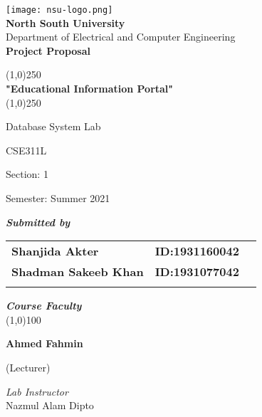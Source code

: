 \documentclass[a4paper,12pt]{article}
\begin{document}
\begin{titlepage}

\begin{center}
    \texttt{[image: nsu-logo.png]}\\
    \textbf{{ \large North South University}}\\
    Department of Electrical and Computer Engineering
    \vspace{0.2in}\\
    
    \textbf{\large Project Proposal}
    
     \vspace{0.1in}
     \line(1,0){250}\\
     \vspace{0.1in}
     \textbf{{ \large "Educational Information Portal"}}\\
     \line(1,0){250}\\
     \vspace{0.1in}
    
      Database System Lab
      
      CSE311L

      Section: 1

      Semester: Summer 2021

      \vspace{0.2in}
      \textbf{\emph { Submitted by }}
      
      \vspace{0.3in}
      \begin{tabular}{ l l l}
      \textbf{Shanjida Akter} & \hspace{2.8in} \textbf{ID:1931160042}\\
      \textbf{Shadman Sakeeb Khan} & \hspace{2.8in} \textbf{ID:1931077042}\\
      \vspace{0.1in}    
      \end{tabular}
      \textbf{\emph {Course Faculty} }\\
      \line(1,0){100}
     
      \vspace{0.01in}
      \textbf{\large Ahmed Fahmin}
    
      (Lecturer)
      \vspace{0.3in}
      
      \emph{Lab Instructor}\\
      
      Nazmul Alam Dipto
      
\end{center}
\end{titlepage}
\end{document}
